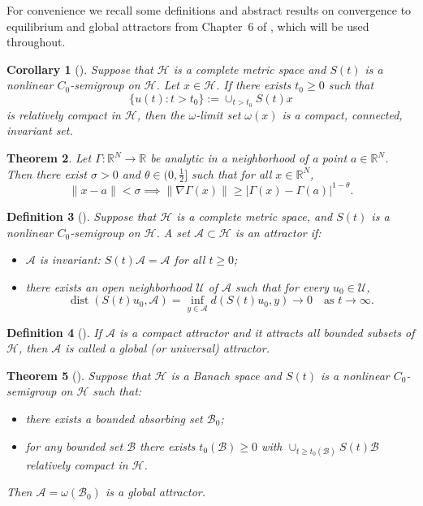 \documentclass[10pt,a4paper]{amsart}
\numberwithin{equation}{section}
\newtheorem{theorem}{Theorem}[section]
\newtheorem{corollary}[theorem]{Corollary}
\newtheorem{definition}[theorem]{Definition}
\begin{document}
For convenience we recall some definitions and abstract results on convergence
to equilibrium and global attractors from Chapter~6 of \cite{Songu}, which will be
used throughout.

\begin{corollary}[\cite{Songu}]  \label{2.2}
Suppose that $\mathcal{H}$ is a complete metric space and $S(t)$ is a nonlinear
$C_0$-semigroup on $\mathcal{H}$. Let $x \in \mathcal{H}$. If there exists $t_0 \ge 0$
such that
\[
\{ u(t) : t > t_0 \} := \cup_{t > t_0} S(t) x
\]
is relatively compact in $\mathcal{H}$, then the $\omega$-limit set $\omega(x)$ is a
compact, connected, invariant set.
\end{corollary}

\begin{theorem}\cite{Songu}
Let $\Gamma : \mathbb{R}^N \to \mathbb{R}$ be analytic in a neighborhood of a point
$a \in \mathbb{R}^N$. Then there exist $\sigma > 0$ and $\theta \in (0, \tfrac12]$
such that for all $x \in \mathbb{R}^N$,
\[
\|x - a\| < \sigma \implies  \|\nabla \Gamma(x)\| \ge |\Gamma(x)
- \Gamma(a)|^{1 - \theta}.
\]
\end{theorem}

\begin{definition}[\cite{Songu}] \rm
Suppose that $\mathcal{H}$ is a complete metric space, and $S(t)$ is a nonlinear
 $C_0$-semigroup on $\mathcal{H}$. A set $\mathcal{A} \subset \mathcal{H}$ is an
 \emph{attractor} if:
\begin{itemize}
\item[(i)] $\mathcal{A}$ is invariant: $S(t)\mathcal{A} = \mathcal{A}$ for all
$t \ge 0$;
\item[(ii)] there exists an open neighborhood $\mathcal{U}$ of $\mathcal{A}$ such
that for every $u_0 \in \mathcal{U}$,
\[
\operatorname{dist} \left( S(t) u_0, \mathcal{A} \right) = \inf_{y \in \mathcal{A}}
d \left( S(t) u_0, y \right) \longrightarrow 0 \quad \text{as } t \to \infty.
\]
\end{itemize}
\end{definition}

\begin{definition}[\cite{Songu}] \rm
If $\mathcal{A}$ is a compact attractor and it attracts all bounded subsets of
$\mathcal{H}$, then $\mathcal{A}$ is called a \emph{global} (or \emph{universal})
attractor.
\end{definition}

\begin{theorem}[\cite{Songu}] \label{attractor}
Suppose that $\mathcal{H}$ is a Banach space and $S(t)$ is a nonlinear $C_0$-semigroup
on $\mathcal{H}$ such that:
\begin{itemize}
\item[(i)] there exists a bounded absorbing set $\mathcal{B}_0$;
\item[(ii)] for any bounded set $\mathcal{B}$ there exists $t_0(\mathcal{B}) \ge 0$
with
$\cup_{t \ge t_0(\mathcal{B})} S(t) \mathcal{B}$
relatively compact in $\mathcal{H}$.
\end{itemize}
Then $\mathcal{A} = \omega(\mathcal{B}_0)$ is a global attractor.
\end{theorem}
\end{document}
